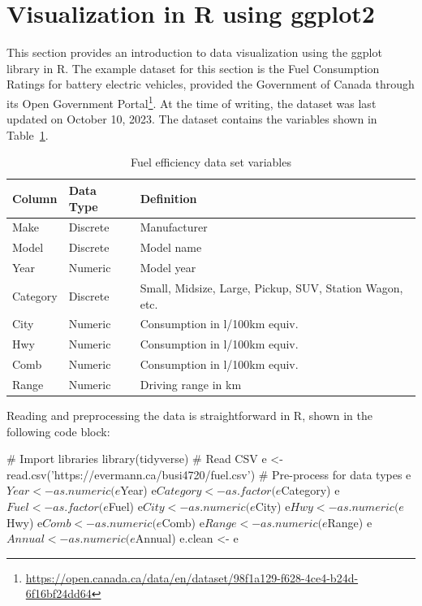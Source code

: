 \section{Visualization in R using ggplot2}

This section provides an introduction to data visualization using the ggplot library in R. The example dataset for this section is the Fuel Consumption Ratings for battery electric vehicles, provided the Government of Canada through its Open Government Portal\footnote{\scriptsize\url{https://open.canada.ca/data/en/dataset/98f1a129-f628-4ce4-b24d-6f16bf24dd64}}. At the time of writing, the dataset was last updated on October 10, 2023. The dataset contains the variables shown in Table~\ref{tab:fueldata}.

\begin{table}[h]
\centering
\renewcommand{\arraystretch}{1.25}

\begin{tabularx}{\linewidth}{|l|l|X|} \hline
  {\bf Column} & {\bf Data Type} & {\bf Definition} \\ \hline \hline
  Make & Discrete & Manufacturer \\ 
  Model & Discrete & Model name\\
  Year & Numeric & Model year \\
  Category & Discrete & Small, Midsize, Large, Pickup, SUV, Station Wagon, etc. \\
  City & Numeric & Consumption in l/100km equiv. \\
  Hwy & Numeric & Consumption in l/100km equiv. \\
  Comb & Numeric & Consumption in l/100km equiv. \\
  Range & Numeric & Driving range in km \\ \hline
\end{tabularx}
\caption{Fuel efficiency data set variables}
\label{tab:fueldata}
\end{table}

\noindent Reading and preprocessing the data is straightforward in R, shown in the following code block:

\begin{samepage}
\begin{Rcode}
# Import libraries
library(tidyverse)
# Read CSV
e <- read.csv('https://evermann.ca/busi4720/fuel.csv')
# Pre-process for data types
e$Year <- as.numeric(e$Year)
e$Category <- as.factor(e$Category)
e$Fuel <- as.factor(e$Fuel)
e$City <- as.numeric(e$City)
e$Hwy <- as.numeric(e$Hwy)
e$Comb <- as.numeric(e$Comb)
e$Range <- as.numeric(e$Range)
e$Annual <- as.numeric(e$Annual)
e.clean <- e
\end{Rcode}
\end{samepage}

